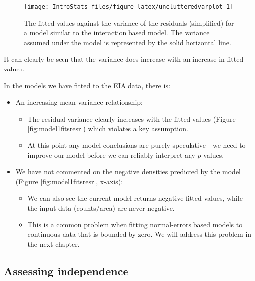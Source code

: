 \documentclass[
  oneside]{krantz}
\providecommand{\tightlist}{%
  \setlength{\itemsep}{0pt}\setlength{\parskip}{0pt}}
\begin{document}
\begin{figure}

{\centering \texttt{[image: IntroStats\_files/figure-latex/unclutteredvarplot-1]} 

}

\caption{The fitted values against the variance of the residuals (simplified) for a model similar to the interaction based model. The variance assumed under the model is represented by the solid horizontal line.}\label{fig:unclutteredvarplot}
\end{figure}

It can clearly be seen that the variance does increase with an increase in fitted values.

In the models we have fitted to the EIA data, there is:

\begin{itemize}
\item
  An increasing mean-variance relationship:

  \begin{itemize}
  \tightlist
  \item
    The residual variance clearly increases with the fitted values (Figure \ref{fig:model1fitsresr}) which violates a key assumption.
  \item
    At this point any model conclusions are purely speculative - we need to improve our model before we can reliably interpret any \(p\)-values.
  \end{itemize}
\item
  We have not commented on the negative densities predicted by the model (Figure \ref{fig:model1fitsresr}, x-axis):

  \begin{itemize}
  \tightlist
  \item
    We can also see the current model returns negative fitted values, while the input data (counts/area) are never negative.
  \item
    This is a common problem when fitting normal-errors based models to continuous data that is bounded by zero. We will address this problem in the next chapter.
  \end{itemize}
\end{itemize}

\hypertarget{assessing-independence}{%
\subsection{Assessing independence}\label{assessing-independence}}
\end{document}
